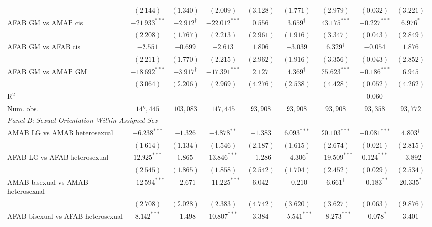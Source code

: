 \begin{table}[htpb!]
{\begin{tabular}{l c c c c c c c c}
 & $(2.144)$ & $(1.340)$ & $(2.009)$ & $(3.128)$ & $(1.771)$ & $(2.979)$ & $(0.032)$ & $(3.221)$ \\
AFAB GM vs AMAB cis & $-21.933^{***}$ & $-2.912^{\dagger}$ & $-22.012^{***}$ & $0.556$ & $3.659^{\dagger}$ & $43.175^{***}$ & $-0.227^{***}$ & $6.976^{*}$ \\
 & $(2.208)$ & $(1.767)$ & $(2.213)$ & $(2.961)$ & $(1.916)$ & $(3.347)$ & $(0.043)$ & $(2.849)$ \\
AFAB GM vs AFAB cis & $-2.551$ & $-0.699$ & $-2.613$ & $1.806$ & $-3.039$ & $6.329^{\dagger}$ & $-0.054$ & $1.876$ \\
 & $(2.211)$ & $(1.770)$ & $(2.215)$ & $(2.962)$ & $(1.916)$ & $(3.356)$ & $(0.043)$ & $(2.852)$ \\
AFAB GM vs AMAB GM & $-18.692^{***}$ & $-3.917^{\dagger}$ & $-17.391^{***}$ & $2.127$ & $4.369^{\dagger}$ & $35.623^{***}$ & $-0.186^{***}$ & $6.945$ \\
 & $(3.064)$ & $(2.206)$ & $(2.969)$ & $(4.276)$ & $(2.538)$ & $(4.428)$ & $(0.052)$ & $(4.262)$ \\
\hline
R$^2$ & -- & -- & -- & -- & -- & -- & $0.060$ & -- \\
Num. obs. & $147,445$ & $103,083$ & $147,445$ & $93,908$ & $93,908$ & $93,908$ & $93,358$ & $93,772$ \\
\hline
\multicolumn{9}{l}{\textit{Panel B: Sexual Orientation Within Assigned Sex}} \\
AMAB LG vs AMAB heterosexual & $-6.238^{***}$ & $-1.326$ & $-4.878^{**}$ & $-1.383$ & $6.093^{***}$ & $20.103^{***}$ & $-0.081^{***}$ & $4.803^{\dagger}$ \\
 & $(1.614)$ & $(1.134)$ & $(1.546)$ & $(2.187)$ & $(1.615)$ & $(2.674)$ & $(0.021)$ & $(2.815)$ \\
AFAB LG vs AFAB heterosexual & $12.925^{***}$ & $0.865$ & $13.846^{***}$ & $-1.286$ & $-4.306^{*}$ & $-19.509^{***}$ & $0.124^{***}$ & $-3.892$ \\
 & $(2.545)$ & $(1.865)$ & $(1.858)$ & $(2.542)$ & $(1.704)$ & $(2.452)$ & $(0.029)$ & $(2.534)$ \\
AMAB bisexual vs AMAB heterosexual & $-12.594^{***}$ & $-2.671$ & $-11.225^{***}$ & $6.042$ & $-0.210$ & $6.661^{\dagger}$ & $-0.183^{**}$ & $20.335^{*}$ \\
 & $(2.708)$ & $(2.028)$ & $(2.383)$ & $(4.742)$ & $(3.620)$ & $(3.627)$ & $(0.063)$ & $(9.876)$ \\
AFAB bisexual vs AFAB heterosexual & $8.142^{***}$ & $-1.498$ & $10.807^{***}$ & $3.384$ & $-5.541^{***}$ & $-8.273^{***}$ & $-0.078^{*}$ & $3.401$ \\

\end{tabular}}
\end{table}
